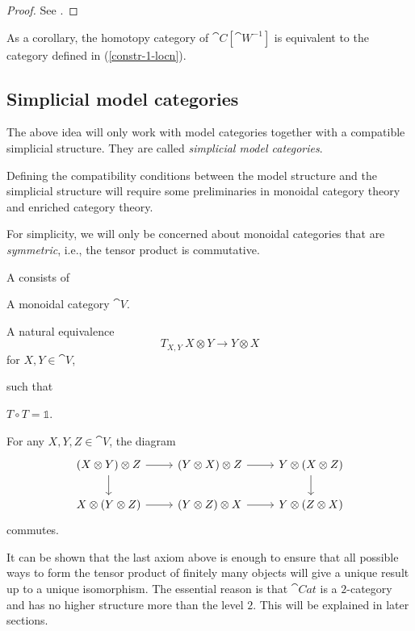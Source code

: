 \begin{proof}
    See \cite[\S1.2]{hinich13}.
\end{proof}

As a corollary, the homotopy category of $\cat{C}[\cat{W}^{-1}]$
is equivalent to the category defined in (\ref{constr-1-locn}).

\subsection{Simplicial model categories}

The above idea will only work with model categories 
together with a compatible simplicial structure.
They are called \emph{simplicial model categories}.

Defining the compatibility conditions between the model structure
and the simplicial structure will require some
preliminaries in monoidal category theory and enriched category theory.

For simplicity, we will only be concerned about
monoidal categories that are \emph{symmetric},
i.e., the tensor product is commutative.

\begin{definition}
    A  consists of
    \begin{itms}
        \item A monoidal category $\cat{V}$.
        \item A natural equivalence
        \[ T_{X,Y} \: X \otimes Y \to Y \otimes X \]
        for $X,Y \in \cat{V}$,
    \end{itms}
    such that
    \begin{itms}
        \item $T \circ T = \mathbb{1}$.
        \item For any $X,Y,Z \in \cat{V}$, the diagram
        \[ \begin{tikzcd}
            (X\otimes Y)\otimes Z\ar[r]\ar[d] &
            (Y\otimes X)\otimes Z\ar[r] &
            Y\otimes(X\otimes Z)\ar[d] \\
            X\otimes(Y\otimes Z)\ar[r] &
            (Y\otimes Z)\otimes X\ar[r] &
            Y\otimes(Z\otimes X)
        \end{tikzcd} \]
        commutes.
    \end{itms}
\end{definition}

It can be shown that the last axiom above is enough
to ensure that all possible ways to form the tensor product 
of finitely many objects will give a unique result up to 
a unique isomorphism.
The essential reason is that $\cat{Cat}$ is a $2$-category 
and has no higher structure more than the level $2$.
This will be explained in later sections.

